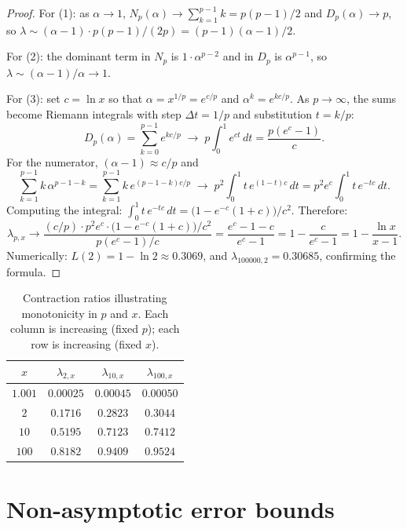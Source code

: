 \documentclass[10pt,a4paper,oneside]{book}
\theoremstyle{definition}
\theoremstyle{remark}
\begin{document}
\begin{proof}
For (1): as $\alpha \to 1$, $N_p(\alpha) \to \sum_{k=1}^{p-1}k = p(p-1)/2$ and $D_p(\alpha) \to p$, so $\lambda \sim (\alpha-1) \cdot p(p-1)/(2p) = (p-1)(\alpha-1)/2$.

For (2): the dominant term in $N_p$ is $1 \cdot \alpha^{p-2}$ and in $D_p$ is $\alpha^{p-1}$, so $\lambda \sim (\alpha-1)/\alpha \to 1$.

For (3): set $c = \ln x$ so that $\alpha = x^{1/p} = e^{c/p}$ and $\alpha^k = e^{kc/p}$.  As $p \to \infty$, the sums become Riemann integrals with step $\Delta t = 1/p$ and substitution $t = k/p$:
\[
  D_p(\alpha) = \sum_{k=0}^{p-1} e^{kc/p} \;\to\; p \int_0^1 e^{ct}\,dt = \frac{p(e^c - 1)}{c}.
\]
For the numerator, $(\alpha - 1) \approx c/p$ and
\[
  \sum_{k=1}^{p-1} k\,\alpha^{p-1-k}
  = \sum_{k=1}^{p-1} k\, e^{(p-1-k)c/p}
  \;\to\; p^2 \int_0^1 t\, e^{(1-t)c}\,dt
  = p^2 e^c \int_0^1 t\, e^{-tc}\,dt.
\]
Computing the integral: $\int_0^1 t\,e^{-tc}\,dt = \bigl(1 - e^{-c}(1+c)\bigr)/c^2$.  Therefore:
\[
  \lambda_{p,x} \to \frac{(c/p) \cdot p^2 e^c \cdot \bigl(1 - e^{-c}(1+c)\bigr)/c^2}{\,p(e^c-1)/c\,}
  = \frac{e^c - 1 - c}{e^c - 1}
  = 1 - \frac{c}{e^c - 1}
  = 1 - \frac{\ln x}{x - 1}.
\]
Numerically: $L(2) = 1 - \ln 2 \approx 0.3069$, and $\lambda_{100000,2} = 0.30685$, confirming the formula.
\end{proof}

\begin{table}[h]
\centering
\begin{tabular}{cccc}
\toprule
$x$ & $\lambda_{2,x}$ & $\lambda_{10,x}$ & $\lambda_{100,x}$ \\
\midrule
$1.001$ & $0.00025$ & $0.00045$ & $0.00050$ \\
$2$ & $0.1716$ & $0.2823$ & $0.3044$ \\
$10$ & $0.5195$ & $0.7123$ & $0.7412$ \\
$100$ & $0.8182$ & $0.9409$ & $0.9524$ \\
\bottomrule
\end{tabular}
\caption{Contraction ratios illustrating monotonicity in $p$ and $x$. Each column is increasing (fixed $p$); each row is increasing (fixed $x$).}
\end{table}

\section{Non-asymptotic error bounds}
\label{sec:nonasymptotic}
\end{document}
